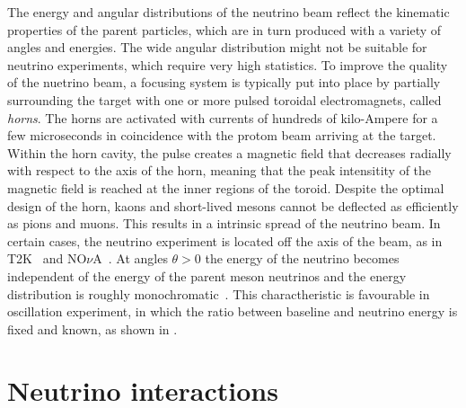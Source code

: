 The energy and angular distributions of the neutrino beam reflect the kinematic properties of %
the parent particles, which are in turn produced with a variety of angles and energies.
The wide angular distribution might not be suitable for neutrino experiments, which require very high statistics.
To improve the quality of the nuetrino beam, a focusing system is typically put into place %
by partially surrounding the target with one or more pulsed toroidal electromagnets, called \emph{horns}.
The horns are activated with currents of hundreds of kilo-Ampere for a few microseconds %
in coincidence with the protom beam arriving at the target.
Within the horn cavity, the pulse creates a magnetic field that decreases %
radially with respect to the axis of the horn, meaning that the peak intensitity of the magnetic field %
is reached at the inner regions of the toroid.
Despite the optimal design of the horn, kaons and short-lived mesons cannot be deflected as efficiently %
as pions and muons.
This results in a intrinsic spread of the neutrino beam.
In certain cases, the neutrino experiment is located off the axis of the beam, as in T2K~\cite{Abe:2012av} %
and NO$\nu$A~\cite{Ayres:2004js}.
At angles $\theta > 0$ the energy of the neutrino becomes independent of the %
energy of the parent meson neutrinos and the energy distribution is roughly monochromatic~\cite{Beavis_Carroll_Chiang_1995}.
This charactheristic is favourable in oscillation experiment, in which the ratio between baseline and %
neutrino energy is fixed and known, as shown in .


\section{Neutrino interactions}
\label{sec:neutrino_interactions}

